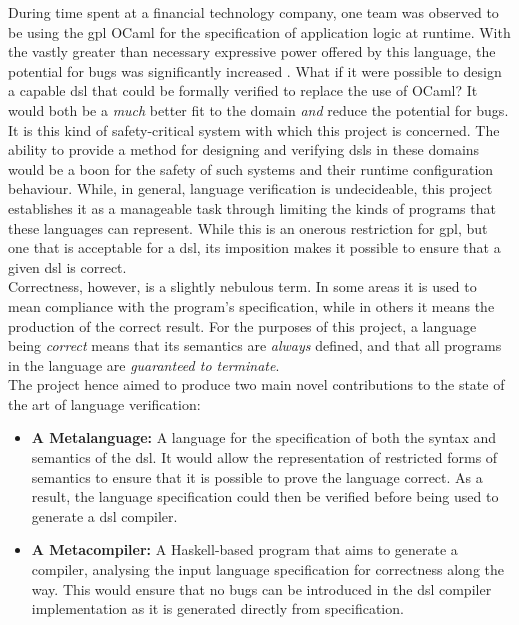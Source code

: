 During time spent at a financial technology company, one team was observed to be using the \gls{gpl} OCaml for the specification of application logic at runtime. 
With the vastly greater than necessary expressive power offered by this language, the potential for bugs was significantly increased \citep{subramanyam2003empirical}.
What if it were possible to design a capable \gls{dsl} that could be formally verified to replace the use of OCaml?
It would both be a \textit{much} better fit to the domain \textit{and} reduce the potential for bugs.\\

It is this kind of safety-critical system with which this project is concerned.
The ability to provide a method for designing and verifying \glspl{dsl} in these domains would be a boon for the safety of such systems and their runtime configuration behaviour.
While, in general, language verification is undecideable, this project establishes it as a manageable task through limiting the kinds of programs that these languages can represent.
While this is an onerous restriction for \gls{gpl}, but one that is acceptable for a \gls{dsl}, its imposition makes it possible to ensure that a given \gls{dsl} is correct.\\

Correctness, however, is a slightly nebulous term. 
In some areas it is used to mean compliance with the program's specification, while in others it means the production of the correct result.
For the purposes of this project, a language being \textit{correct} means that its semantics are \textit{always} defined, and that all programs in the language are \textit{guaranteed to terminate}. \\

The project hence aimed to produce two main novel contributions to the state of the art of language verification:
\begin{itemize}
    \item \textbf{A Metalanguage:} A language for the specification of both the \gls{syntax} and \gls{semantics} of the \gls{dsl}. 
    It would allow the representation of restricted forms of semantics to ensure that it is possible to prove the language correct.
    As a result, the language specification could then be verified before being used to generate a \gls{dsl} compiler. 
    \item \textbf{A Metacompiler:} A Haskell-based program that aims to generate a compiler, analysing the input language specification for correctness along the way.
    This would ensure that no bugs can be introduced in the \gls{dsl} compiler implementation as it is generated directly from specification.
\end{itemize}

